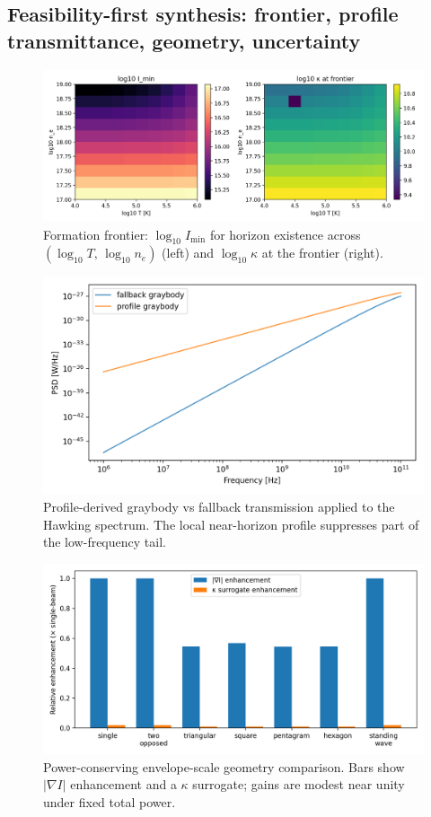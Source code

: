 \documentclass[11pt]{article}
\begin{document}
\subsection{Feasibility-first synthesis: frontier, profile transmittance, geometry, uncertainty}
\begin{figure}[h]
  \centering
  \includegraphics[width=0.95\linewidth]{figures/formation_frontier.png}
  \caption{Formation frontier: $\log_{10} I_{\min}$ for horizon existence across $(\log_{10} T,\, \log_{10} n_e)$ (left) and $\log_{10} \kappa$ at the frontier (right).}
\end{figure}

\begin{figure}[h]
  \centering
  \includegraphics[width=0.8\linewidth]{figures/graybody_impact.png}
  \caption{Profile-derived graybody vs fallback transmission applied to the Hawking spectrum. The local near-horizon profile suppresses part of the low-frequency tail.}
\end{figure}

\begin{figure}[h]
  \centering
  \includegraphics[width=0.8\linewidth]{figures/geometry_vs_kappa.png}
  \caption{Power-conserving envelope-scale geometry comparison. Bars show $|\nabla I|$ enhancement and a $\kappa$ surrogate; gains are modest near unity under fixed total power.}
\end{figure}
\end{document}
